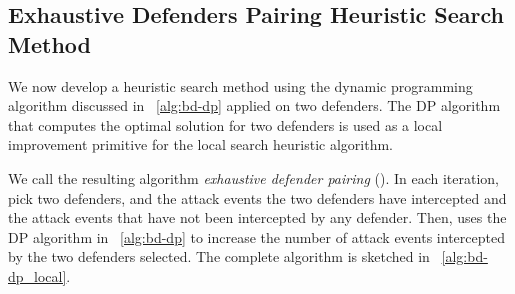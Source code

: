 
\subsection{Exhaustive Defenders Pairing Heuristic Search Method}
\label{sec:bd-dp_local}
We now develop a heuristic search method using the dynamic programming algorithm discussed in ~\ref{alg:bd-dp} 
applied on two defenders.
The DP algorithm that computes the optimal solution for two defenders is used as a local improvement primitive 
for the local search heuristic algorithm. 

We call the resulting algorithm \emph{exhaustive defender pairing} (\ours).  
In each iteration, \ours pick two defenders, and the attack events the two defenders have intercepted and the attack events that have not been intercepted by any defender. 
Then, \ours uses the DP algorithm in ~\ref{alg:bd-dp} to increase the number of attack events intercepted by the two defenders selected. 
The complete algorithm is sketched in ~\ref{alg:bd-dp_local}.

